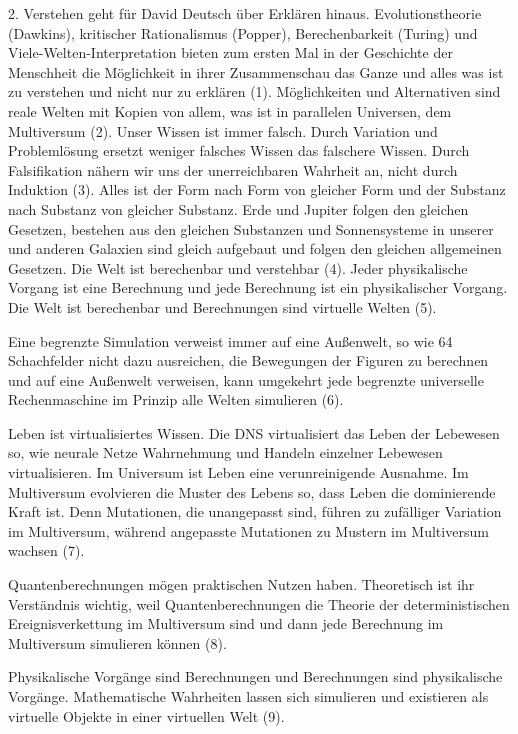 \documentclass[
]{article}
\begin{document}
2. Verstehen geht für David Deutsch über Erklären hinaus. Evolutionstheorie (Dawkins), kritischer Rationalismus (Popper), Berechenbarkeit (Turing) und Viele-Welten-Interpretation bieten zum ersten Mal in der Geschichte der Menschheit die Möglichkeit in ihrer Zusammenschau das Ganze und alles was ist zu verstehen und nicht nur zu erklären (1). Möglichkeiten und Alternativen sind reale Welten mit Kopien von allem, was ist in parallelen Universen, dem Multiversum (2). Unser Wissen ist immer falsch. Durch Variation und Problemlösung ersetzt weniger falsches Wissen das falschere Wissen. Durch Falsifikation nähern wir uns der unerreichbaren Wahrheit an, nicht durch Induktion (3). Alles ist der Form nach Form von gleicher Form und der Substanz nach Substanz von gleicher Substanz. Erde und Jupiter folgen den gleichen Gesetzen, bestehen aus den gleichen Substanzen und Sonnensysteme in unserer und anderen Galaxien sind gleich aufgebaut und folgen den gleichen allgemeinen Gesetzen. Die Welt ist berechenbar und verstehbar (4). Jeder physikalische Vorgang ist eine Berechnung und jede Berechnung ist ein physikalischer Vorgang. Die Welt ist berechenbar und Berechnungen sind virtuelle Welten (5).

Eine begrenzte Simulation verweist immer auf eine Außenwelt, so wie 64 Schachfelder nicht dazu ausreichen, die Bewegungen der Figuren zu berechnen und auf eine Außenwelt verweisen, kann umgekehrt jede begrenzte universelle Rechenmaschine im Prinzip alle Welten simulieren (6).

Leben ist virtualisiertes Wissen. Die DNS virtualisiert das Leben der Lebewesen so, wie neurale Netze Wahrnehmung und Handeln einzelner Lebewesen virtualisieren. Im Universum ist Leben eine verunreinigende Ausnahme. Im Multiversum evolvieren die Muster des Lebens so, dass Leben die dominierende Kraft ist. Denn Mutationen, die unangepasst sind, führen zu zufälliger Variation im Multiversum, während angepasste Mutationen zu Mustern im Multiversum wachsen (7).

Quantenberechnungen mögen praktischen Nutzen haben. Theoretisch ist ihr Verständnis wichtig, weil Quantenberechnungen die Theorie der deterministischen Ereignisverkettung im Multiversum sind und dann jede Berechnung im Multiversum simulieren können (8).

Physikalische Vorgänge sind Berechnungen und Berechnungen sind physikalische Vorgänge. Mathematische Wahrheiten lassen sich simulieren und existieren als virtuelle Objekte in einer virtuellen Welt (9).
\end{document}
